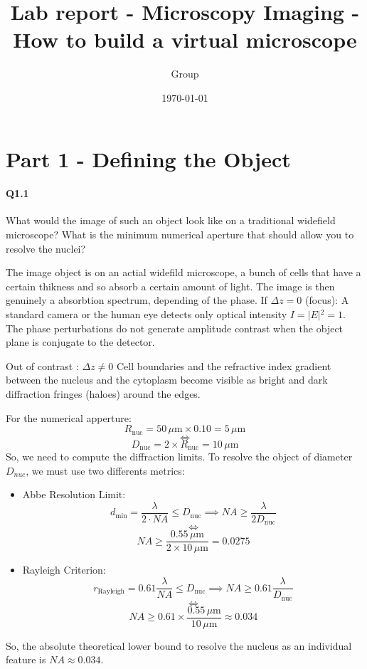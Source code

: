 \documentclass[12pt]{article}
\author{Group}
\title{Lab report - Microscopy Imaging - How to build a virtual microscope}
\date{\today}
\begin{document}
\maketitle



\section{Part 1 - Defining the Object}
\paragraph{Q1.1} What would the image of such an object look like on a traditional widefield
microscope? What is the minimum numerical aperture that should allow you to resolve the
nuclei?

The image object is on an actial widefild microscope, a bunch of cells that have a certain thikness and so absorb a certain amount of light.
The image is then genuinely a absorbtion spectrum, depending of the phase.
If $\Delta z = 0$ (focus):
A standard camera or the human eye detects only optical intensity $I = \vert{}E\vert{}^2 = 1$. The phase perturbations do not generate amplitude contrast when the object plane is conjugate to the detector.

Out of contrast : $\Delta z \neq 0$
Cell boundaries and the refractive index gradient between the nucleus and the cytoplasm become visible as bright and dark diffraction fringes (haloes) around the edges.

For the numerical apperture:
$$R_{\text{nuc}} = 50\,\mu\text{m} \times 0.10 = 5\,\mu\text{m}$$
$$\Leftrightarrow$$
$$D_{\text{nuc}} = 2 \times R_{\text{nuc}} = 10\,\mu\text{m}$$
So, we need to compute the diffraction limits.
To resolve the object of diameter $D_{nuc}$, we must use two differents metrics:
\begin {itemize}
    \item Abbe Resolution Limit:$$d_{\text{min}} = \frac{\lambda}{2 \cdot NA} \le D_{\text{nuc}} \implies NA \ge \frac{\lambda}{2 D_{\text{nuc}}}$$ $$\Leftrightarrow$$ $$NA \ge \frac{0.55\,\mu\text{m}}{2 \times 10\,\mu\text{m}} = \mathbf{0.0275}$$
    \item Rayleigh Criterion:$$r_{\text{Rayleigh}} = 0.61 \frac{\lambda}{NA} \le D_{\text{nuc}} \implies NA \ge 0.61 \frac{\lambda}{D_{\text{nuc}}}$$ $$\Leftrightarrow$$ $$NA \ge 0.61 \times \frac{0.55\,\mu\text{m}}{10\,\mu\text{m}} \approx \mathbf{0.034}$$
\end{itemize}
So, the absolute theoretical lower bound to resolve the nucleus as an individual feature is $NA \approx 0.034$.
\end{document}
